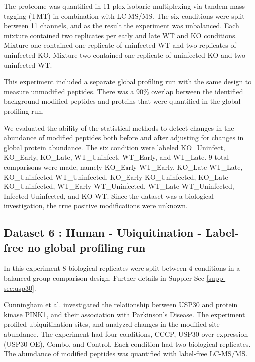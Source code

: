\documentclass[mcp]{article}
\numberwithin{table}{section}
\begin{document}
The proteome was quantified in 11-plex isobaric multiplexing via tandem mass tagging (TMT) in combination with LC-MS/MS. The six conditions were split between 11 channels, and as the result the experiment was unbalanced. Each mixture contained two replicates per early and late WT and KO conditions. Mixture one contained one replicate of uninfected WT and two replicates of uninfected KO. Mixture two contained one replicate of uninfected KO and two uninfected WT.

\medskip {} This experiment included a separate global profiling run with the same design to measure unmodified peptides. There was a 90\% overlap between the identified background modified peptides and proteins that were quantified in the global profiling run.

\medskip {} We evaluated the ability of the statistical methods to detect changes in the abundance of modified peptides both before and after adjusting for changes in global protein abundance. The six condition were labeled KO\_Uninfect, KO\_Early, KO\_Late, WT\_Uninfect, WT\_Early, and WT\_Late. 9 total comparisons were made, namely KO\_Early-WT\_Early, KO\_Late-WT\_Late, KO\_Uninfected-WT\_Uninfected, KO\_Early-KO\_Uninfected, KO\_Late-KO\_Uninfected, WT\_Early-WT\_Uninfected, WT\_Late-WT\_Uninfected, Infected-Uninfected, and KO-WT. Since the dataset was a biological investigation, the true positive modifications were unknown.


\subsection*{Dataset 6 : Human - Ubiquitination - Label-free no global profiling run}
\label{sec:exp_proc_dataset6}

In this experiment 8 biological replicates were split between 4 conditions in a balanced group comparison design. Further details in Suppler Sec \ref{supp-sec:usp30}.
 
\medskip {} Cunningham et al. \cite{Cunningham2015} investigated the relationship between USP30 and protein kinase PINK1, and their association with Parkinson’s Disease. The experiment profiled ubiquitination sites, and analyzed changes in the modified site abundance. The experiment had four conditions, CCCP, USP30 over expression (USP30 OE), Combo, and Control. Each condition had two biological replicates. The abundance of modified peptides was quantified with label-free LC-MS/MS.
\end{document}
